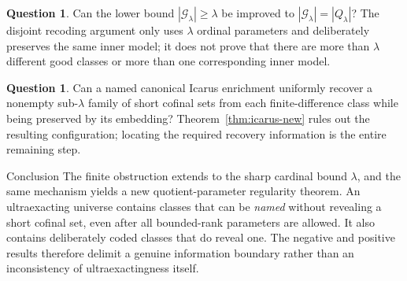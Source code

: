 \documentclass[11pt,letterpaper]{article}
\theoremstyle{definition}
\newtheorem{question}[definition]{Question}
\numberwithin{equation}{section}
\newcommand{\Qlam}{Q_\lambda}
\newcommand{\Good}{\mathcal G_\lambda}
\begin{document}
\begin{question}
Can the lower bound $|\Good|\ge\lambda$ be improved to $|\Good|=|\Qlam|$? The disjoint recoding argument only uses $\lambda$ ordinal parameters and deliberately preserves the same inner model; it does not prove that there are more than $\lambda$ different good classes or more than one corresponding inner model.
\end{question}

\begin{question}
Can a named canonical Icarus enrichment uniformly recover a nonempty sub-$\lambda$ family of short cofinal sets from each finite-difference class while being preserved by its embedding? Theorem~\ref{thm:icarus-new} rules out the resulting configuration; locating the required recovery information is the entire remaining step.
\end{question}

\begin{assessment}{Conclusion}
The finite obstruction extends to the sharp cardinal bound $\lambda$, and the same mechanism yields a new quotient-parameter regularity theorem. An ultraexacting universe contains classes that can be \emph{named} without revealing a short cofinal set, even after all bounded-rank parameters are allowed. It also contains deliberately coded classes that do reveal one. The negative and positive results therefore delimit a genuine information boundary rather than an inconsistency of ultraexactingness itself.
\end{assessment}
\end{document}
